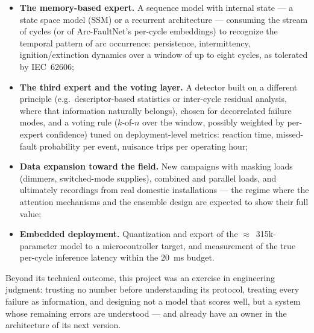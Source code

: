 \begin{itemize}[itemsep=3pt]
    \item \textbf{The memory-based expert.} A sequence model with internal state --- a state space model (SSM) or a recurrent architecture --- consuming the stream of cycles (or of Arc-FaultNet's per-cycle embeddings) to recognize the temporal pattern of arc occurrence: persistence, intermittency, ignition/extinction dynamics over a window of up to eight cycles, as tolerated by IEC~62606;
    \item \textbf{The third expert and the voting layer.} A detector built on a different principle (e.g.\ descriptor-based statistics or inter-cycle residual analysis, where that information naturally belongs), chosen for decorrelated failure modes, and a voting rule ($k$-of-$n$ over the window, possibly weighted by per-expert confidence) tuned on deployment-level metrics: reaction time, missed-fault probability per event, nuisance trips per operating hour;
    \item \textbf{Data expansion toward the field.} New campaigns with masking loads (dimmers, switched-mode supplies), combined and parallel loads, and ultimately recordings from real domestic installations --- the regime where the attention mechanisms and the ensemble design are expected to show their full value;
    \item \textbf{Embedded deployment.} Quantization and export of the $\approx$~315k-parameter model to a microcontroller target, and measurement of the true per-cycle inference latency within the 20~ms budget.
\end{itemize}

\medskip

Beyond its technical outcome, this project was an exercise in engineering judgment: trusting no number before understanding its protocol, treating every failure as information, and designing not a model that scores well, but a system whose remaining errors are understood --- and already have an owner in the architecture of its next version.
